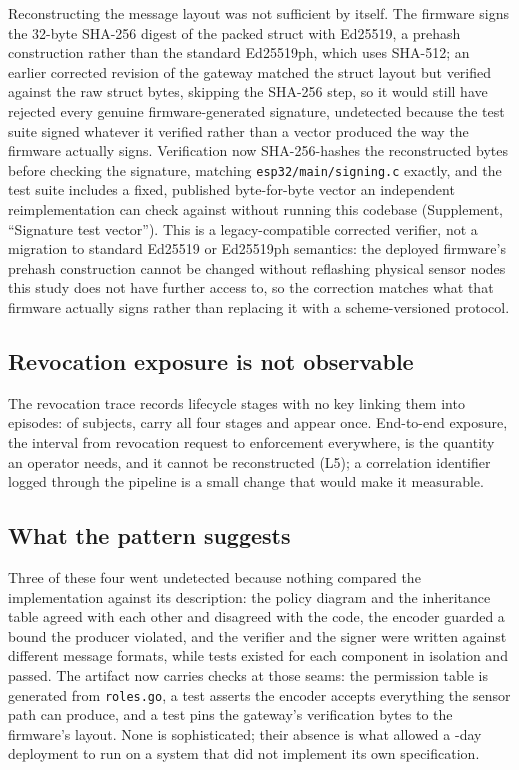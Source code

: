 \documentclass[a4paper,fleqn]{cas-sc}
\begin{document}
Reconstructing the message layout was not sufficient by itself. The
firmware signs the 32-byte SHA-256 digest of the packed struct with
Ed25519, a prehash construction rather than the standard Ed25519ph, which
uses SHA-512; an earlier corrected revision of the gateway matched the
struct layout but verified against the raw struct bytes, skipping the
SHA-256 step, so it would still have rejected every genuine
firmware-generated signature, undetected because the test suite signed
whatever it verified rather than a vector produced the way the firmware
actually signs. Verification now SHA-256-hashes the reconstructed bytes
before checking the signature, matching \texttt{esp32/main/signing.c}
exactly, and the test suite includes a fixed, published byte-for-byte
vector an independent reimplementation can check against without running
this codebase (Supplement, ``Signature test vector''). This is a
legacy-compatible corrected verifier, not a migration to standard
Ed25519 or Ed25519ph semantics: the deployed firmware's prehash
construction cannot be changed without reflashing physical sensor nodes
this study does not have further access to, so the correction matches
what that firmware actually signs rather than replacing it with a
scheme-versioned protocol.

\subsection{Revocation exposure is not observable}
\label{subsec:pm_revocation}

The revocation trace records lifecycle stages with no key linking them
into episodes: of \RevSubjects{} subjects, \RevComplete{} carry all four
stages and \RevSingleStage{} appear once. End-to-end exposure, the
interval from revocation request to enforcement everywhere, is the
quantity an operator needs, and it cannot be reconstructed (L5); a
correlation identifier logged through the pipeline is a small change that
would make it measurable.

\subsection{What the pattern suggests}
\label{subsec:pm_pattern}

Three of these four went undetected because nothing compared the
implementation against its description: the policy diagram and the
inheritance table agreed with each other and disagreed with the code, the
encoder guarded a bound the producer violated, and the verifier and the
signer were written against different message formats, while tests
existed for each component in isolation and passed. The artifact now
carries checks at those seams: the permission table is generated from
\texttt{roles.go}, a test asserts the encoder accepts everything the
sensor path can produce, and a test pins the gateway's verification bytes
to the firmware's layout. None is sophisticated; their absence is what
allowed a \DeployDays-day deployment to run on a system that did not
implement its own specification.
\end{document}

